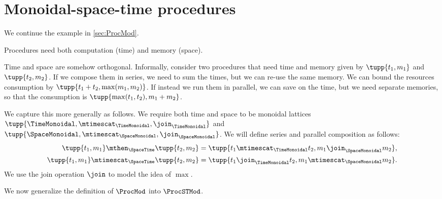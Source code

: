 \section{Monoidal-space-time procedures}
\label{subsec:monoidal-space-time}
We continue the example in \cref{sec:ProcMod}.

Procedures need both computation (time) and memory (space).

Time and space are somehow orthogonal.
%
Informally, consider two procedures that need time and memory given by $\tupp{t_1,m_1}$ and $\tupp{t_2, m_2}$.
If we compose them in series, we need to sum the times, but we can re-use the same memory.
We can bound the resources consumption by $\tupp{t_1+t_2,\max(m_1, m_2)}$.
If instead we run them in parallel, we can save on the time, but we need separate memories, so that the consumption is $\tupp{\max(t_1,t_2), m_1 + m_2}$.

We capture this more generally as follows.
We require both time and space to be monoidal lattices $\tupp{\TimeMonoidal, \mtimescat_{\TimeMonoidal}, \join_{\TimeMonoidal}}$ and
$\tupp{\SpaceMonoidal, \mtimescat_{\SpaceMonoidal}, \join_{\SpaceMonoidal}}$.
%
We will define series and parallel composition as follows:
\begin{equation}
	\begin{aligned}
		\tupp{t_1,m_1} \mthen_{\SpaceTime}  \tupp{t_2,m_2}     & = \tupp{t_1 \mtimescat_{\TimeMonoidal} t_2, m_1 \join_{\SpaceMonoidal} m_2}, \\
		\tupp{t_1,m_1} \mtimescat_{\SpaceTime}  \tupp{t_2,m_2} & = \tupp{t_1 \join_{\TimeMonoidal} t_2, m_1 \mtimescat_{\SpaceMonoidal} m_2}.
	\end{aligned}
\end{equation}
We use the join operation $\join$ to model the idea of $\max$.

We now generalize the definition of $\ProcMod$ into $\ProcSTMod$.


